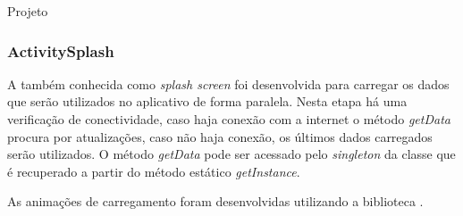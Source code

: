 \documentclass[
	12pt,				%
	openright,			%
	twoside,			%
	a4paper,			%
	english,			%
	french,				%
	spanish,			%
	brazil				%
	]{abntex2}
\begin{document}
\begin{chapter}{Projeto}
\subsubsection{ActivitySplash} \label{splash_activity}
A  também conhecida como \textit{splash screen} foi desenvolvida para carregar os dados que serão utilizados no aplicativo de forma paralela. Nesta etapa há uma verificação de conectividade, caso haja conexão com a internet o método \textit{getData} procura por atualizações, caso não haja conexão, os últimos dados carregados serão utilizados. O método \textit{getData} pode ser acessado pelo \textit{singleton} da classe  que é recuperado a partir do método estático \textit{getInstance}. 

As animações de carregamento foram desenvolvidas utilizando a biblioteca .


\end{chapter}
\end{document}
